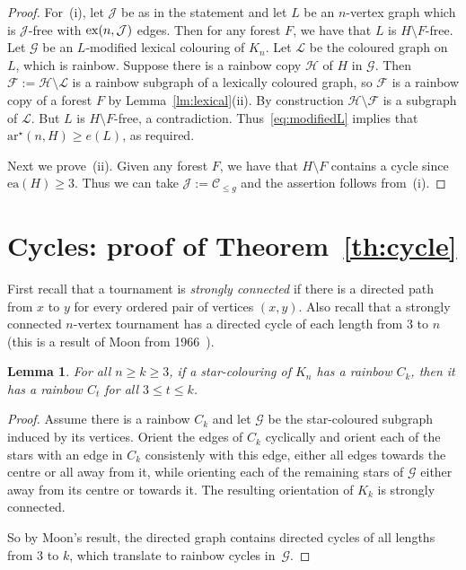 \documentclass[a4paper, 12pt]{article}
\numberwithin{equation}{section}
\newtheorem{lemma}[theorem]{Lemma}
\def\sm{{\setminus}}
\def\sar{{\mathrm{ar}^{\star}}}
\def\ea{{\mathrm{ea}}}
\newcommand{\mc}[1]{\mathcal{#1}}
\newcommand{\ms}[1]{\mathscr{#1}}
\begin{document}
\begin{proof}
For~(i), 
let $\mc{J}$ be as in the statement and let $L$ be an $n$-vertex graph which is $\mc{J}$-free with ${\rm ex}(n,\mc{J})$ edges. Then for any forest $F$, we have that $L$ is $H \sm F$-free. 
Let $\ms{G}$ be an $L$-modified lexical colouring of $K_n$.
Let $\ms{L}$ be the coloured graph on $L$, which is rainbow.
Suppose there is a rainbow copy $\ms{H}$ of $H$ in $\ms{G}$. Then $\ms{F} := \ms{H} \sm \ms{L}$ is a rainbow subgraph of a lexically coloured graph, so $\ms{F}$ is a rainbow copy of a forest $F$ by Lemma~\ref{lm:lexical}(ii).
By construction $\ms{H} \sm \ms{F}$ is a subgraph of $\ms{L}$.
But $L$ is $H \sm F$-free, a contradiction.
Thus~\eqref{eq:modifiedL} implies that $\sar(n,H) \geq e(L)$, as required.

Next we prove~(ii). 
Given any forest $F$, we have that $H \sm F$ contains a cycle since $\ea(H) \geq 3$.
Thus we can take $\mc{J} := \mc{C}_{\leq g}$ and the assertion follows from~(i).
\end{proof}


\section{Cycles: proof of Theorem~\ref{th:cycle}}
\label{sec:cycles}


First recall that a tournament is \emph{strongly connected} if there is a directed path from $x$ to $y$ for every ordered pair of vertices $(x,y)$. Also recall that a strongly connected $n$-vertex tournament has a directed cycle of each length from $3$ to $n$ (this is a result of Moon from 1966~\cite{Moon}). 

\begin{lemma}\label{lm:allcycles}
	For all $n \geq k \geq 3$, if a star-colouring of $K_n$ has a rainbow $C_k$, then it has a rainbow $C_t$ for all $3\leq t \leq k$.
\end{lemma}
\begin{proof}
 Assume there is a rainbow  $C_k$  and let $\ms{G}$ be the star-coloured subgraph induced by its vertices. Orient the edges of $C_k$ cyclically and orient each of the stars with an edge in $C_k$ consistenly with this edge, either all edges towards the centre or all away from it,  while orienting each of the remaining stars of $\ms{G}$ either away from its centre or towards it. The resulting   orientation of $K_k$   is strongly connected.

 So by Moon's result, the directed graph contains directed cycles of all lengths from 3 to $k$, which translate to rainbow cycles in~$\ms{G}$.
\end{proof}
\end{document}
